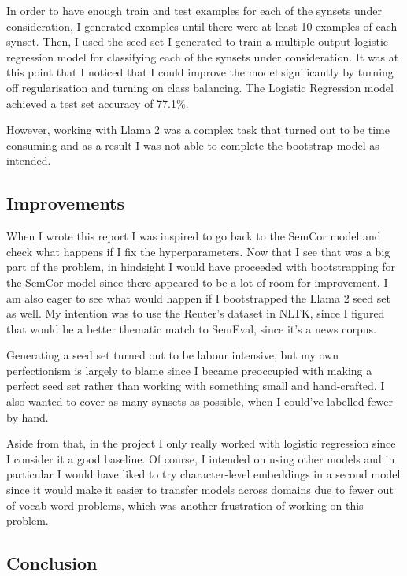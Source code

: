 \documentclass[
10pt, %
a4paper, %
oneside, %
headinclude,footinclude, %
BCOR5mm, %
]{scrartcl}
\begin{document}
In order to have enough train and test examples for each of the synsets under consideration, I generated examples until there were at least 10 examples of each synset. Then, I used the seed set I generated to train a multiple-output logistic regression model for classifying each of the synsets under consideration. It was at this point that I noticed that I could improve the model significantly by turning off regularisation and turning on class balancing. The Logistic Regression model achieved a test set accuracy of 77.1\%.

However, working with Llama 2 was a complex task that turned out to be time consuming and as a result I was not able to complete the bootstrap model as intended.

\subsection{Improvements}

When I wrote this report I was inspired to go back to the SemCor model and check what happens if I fix the hyperparameters. Now that I see that was a big part of the problem, in hindsight I would have proceeded with bootstrapping for the SemCor model since there appeared to be a lot of room for improvement. I am also eager to see what would happen if I bootstrapped the Llama 2 seed set as well. My intention was to use the Reuter's dataset in NLTK, since I figured that would be a better thematic match to SemEval, since it's a news corpus.

Generating a seed set turned out to be labour intensive, but my own perfectionism is largely to blame since I became preoccupied with making a perfect seed set rather than working with something small and hand-crafted. I also wanted to cover as many synsets as possible, when I could've labelled fewer by hand.

Aside from that, in the project I only really worked with logistic regression since I consider it a good baseline. Of course, I intended on using other models and in particular I would have liked to try character-level embeddings in a second model since it would make it easier to transfer models across domains due to fewer out of vocab word problems, which was another frustration of working on this problem.

\subsection{Conclusion}
\end{document}
